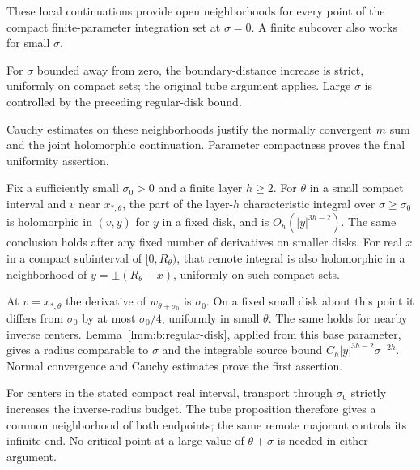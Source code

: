 \begin{prf}
These local continuations provide open neighborhoods for every point of
the compact finite-parameter integration set at $\sigma=0$. A finite
subcover also works for small $\sigma$.

For $\sigma$ bounded away from zero,
the boundary-distance increase is strict, uniformly on compact
sets; the original tube argument applies. Large $\sigma$ is
controlled by the preceding regular-disk bound.

Cauchy estimates on
these neighborhoods justify the normally convergent $m$ sum and
the joint holomorphic continuation. Parameter compactness proves
the final uniformity assertion.
\end{prf}

\begin{crl}\label{crl:b:remote}
Fix a sufficiently small $\sigma_0>0$ and a finite layer $h\geq2$.
For $\theta$ in a small compact interval and $v$ near
$x_{*,\theta}$, the part of the layer-$h$ characteristic integral
over $\sigma\geq\sigma_0$ is holomorphic in $(v,y)$ for $y$ in
a fixed disk, and is $O_h(|y|^{3h-2})$. The same conclusion holds
after any fixed number of derivatives on smaller disks.
For real $x$ in a compact subinterval of $[0,R_\theta)$, that
remote integral is also holomorphic in a neighborhood of
$y=\pm(R_\theta-x)$, uniformly on such compact sets.
\end{crl}
\begin{prf}
At $v=x_{*,\theta}$ the derivative of $w_{\theta+\sigma_0}$ is
$\sigma_0$. On a fixed small disk about this point it differs
from $\sigma_0$ by at most $\sigma_0/4$, uniformly in small
$\theta$. The same holds for nearby inverse centers.
Lemma~\ref{lmm:b:regular-disk}, applied from this base parameter,
gives a radius comparable to $\sigma$ and the integrable source
bound $C_h|y|^{3h-2}\sigma^{-2h}$. Normal convergence and Cauchy
estimates prove the first assertion.

For centers in the stated compact real interval, transport through
$\sigma_0$ strictly increases the inverse-radius budget. The tube
proposition therefore gives a common neighborhood of both endpoints;
the same remote majorant controls its infinite end. No critical point
at a large value of $\theta+\sigma$ is needed in either argument.
\end{prf}
